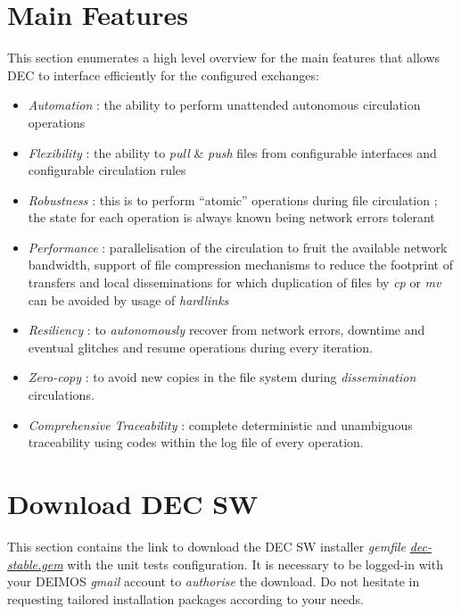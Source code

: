\documentclass[dec_sum_main.tex]{subfiles}
\begin{document}
\section{Main Features}
This section enumerates a high level overview for the main features that allows DEC to interface efficiently for the configured exchanges:

\begin{itemize}
	\item \textit{Automation} : the ability to perform unattended autonomous circulation operations
	\item \textit{Flexibility} : the ability to \textit{pull} \& \textit{push} files from configurable interfaces and configurable circulation rules
	\item \textit{Robustness} : this is to perform “atomic” operations during file circulation ; the state for each operation is always known being network errors tolerant
	\item \textit{Performance} : parallelisation of the circulation to fruit the available network bandwidth, support of file compression mechanisms to reduce the footprint of transfers and local disseminations for which duplication of files by \textit{cp} or \textit{mv} can be avoided by usage of \textit{hardlinks}
	\item \textit{Resiliency} : to \textit{autonomously} recover from network errors, downtime and eventual glitches and resume operations during every iteration.
	\item \textit{Zero-copy} : to avoid new copies in the file system during \textit{dissemination} circulations.	
	\item \textit{Comprehensive Traceability} : complete deterministic and unambiguous traceability using codes within the log file of every operation.	
\end{itemize}

\section{Download DEC SW}
This section contains the link to download the DEC SW installer \textit{gemfile} \href{https://drive.google.com/uc?export=download&id=1gieDRpDEBzKv5Xr0qwPvBz34RHphTnQq}{\textit{dec-stable.gem}} with the unit tests configuration. It is necessary to be logged-in with your DEIMOS \textit{gmail} account to \textit{authorise} the download. Do not hesitate in requesting tailored installation packages according to your needs.

\par
\noindent
\end{document}
